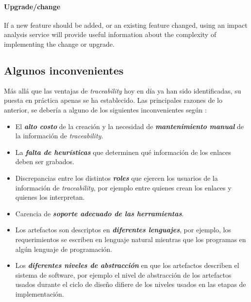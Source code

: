 \documentclass[a4paper,12pt,oneside,spanish]{book}
\begin{document}
\paragraph{Upgrade/change} If a new feature should be added, or an existing feature changed,
using an impact analysis service will provide useful information about the complexity of implementing the change or upgrade.



\subsection{Algunos inconvenientes}

Más allá que las ventajas de \textit{traceability} hoy en día ya han sido identificadas, su puesta en práctica apenas se ha establecido. Las principales razones de lo anterior, se debería a alguno de los siguientes inconvenientes según \cite{GrammelVoigt}:

\begin{itemize}

\item El \textit{\textbf{alto costo}} de la creación y la necesidad de \textit{\textbf{mantenimiento manual}} de la información de \textit{traceability}.

\item La \textit{\textbf{falta de heurísticas}} que determinen qué información de los enlaces deben ser grabados.

\item Discrepancias entre los distintos \textit{\textbf{roles}} que ejercen los usuarios de la información de \textit{traceability}, por ejemplo entre quienes crean los enlaces y quienes los interpretan.

\item Carencia de \textit{\textbf{soporte adecuado de las herramientas}}.

\item Los artefactos son descriptos en \textit{\textbf{diferentes lenguajes}}, por ejemplo, los requerimientos se escriben en lenguaje natural mientras que los programas en algún lenguaje de programación.

\item Los \textit{\textbf{diferentes niveles de abstracción}} en que los artefactos describen el sistema de software, por ejemplo el nivel de abstracción de los artefactos usados durante el ciclo de diseño difiere de los niveles usados en las etapas de implementación.

\end{itemize}
\end{document}
